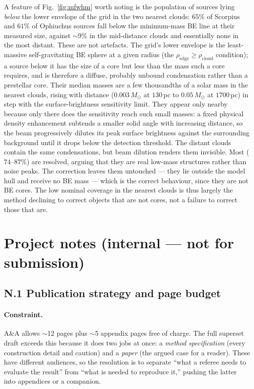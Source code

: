 \documentclass[11pt,a4paper]{article}
\newcommand{\msun}{M_{\odot}}
\begin{document}
A feature of Fig.~\ref{fig:mfwhm} worth noting is the population of sources
lying \emph{below} the lower envelope of the grid in the two nearest clouds:
$65\%$ of Scorpius and $61\%$ of Ophiuchus sources fall below the minimum-mass
BE line at their measured size, against $\sim$$9\%$ in the mid-distance clouds
and essentially none in the most distant. These are not artefacts. The grid's
lower envelope is the least-massive self-gravitating BE sphere at a given
radius (the $\rho_{\mathrm{edge}}\ge\rho_{\mathrm{cloud}}$ condition); a source
below it has the size of a core but less than the mass such a core requires,
and is therefore a diffuse, probably unbound condensation rather than a
prestellar core. Their median masses are a few thousandths of a solar mass in
the nearest clouds, rising with distance ($0.003\,\msun$ at $130$\,pc to
$0.05\,\msun$ at $1700$\,pc) in step with the surface-brightness sensitivity
limit. They appear only nearby because only there does the sensitivity reach
such small masses: a fixed physical density enhancement subtends a smaller
solid angle with increasing distance, so the beam progressively dilutes its
peak surface brightness against the surrounding background until it drops below
the detection threshold. The distant clouds contain the same condensations,
but beam dilution renders them invisible. Most ($74$--$87\%$) are resolved,
arguing that they are real low-mass structures rather than noise peaks. The correction leaves them
untouched --- they lie outside the model hull and receive no BE mass --- which
is the correct behaviour, since they are not BE cores. The low nominal coverage
in the nearest clouds is thus largely the method declining to correct objects
that are not cores, not a failure to correct those that are.

\section*{Project notes (internal --- not for submission)}

\subsection*{N.1 \quad Publication strategy and page budget}

\paragraph{Constraint.} A\&A allows $\sim$12 pages plus $\sim$5 appendix
pages free of charge. The full superset draft exceeds this because it does
two jobs at once: a \emph{method specification} (every construction detail
and caution) and a \emph{paper} (the argued case for a reader). These have
different audiences, so the resolution is to separate ``what a referee needs
to evaluate the result'' from ``what is needed to reproduce it,'' pushing
the latter into appendices or a companion.
\end{document}
